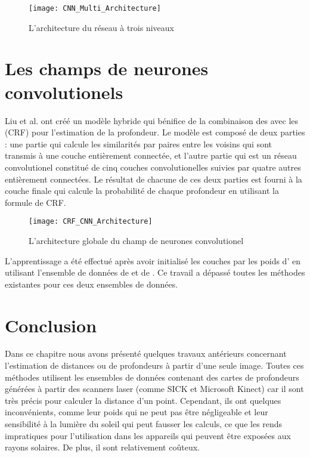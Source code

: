 \begin{figure}[H]
\begin{center}
\texttt{[image: CNN\_Multi\_Architecture]}
\caption{L'architecture du réseau à trois niveaux}{}
\end{center}
\end{figure}

\section{Les champs de neurones convolutionels}

Liu et al.\cite{liu2015deep} ont créé un modèle hybride qui bénifice de la combinaison
des  avec les  (CRF) pour l'estimation de la profondeur. Le modèle est composé de deux
parties : une partie qui calcule les similarités par paires entre les
 voisins qui sont transmis à une couche entièrement connectée,
et l'autre partie qui est un réseau convolutionel constitué de cinq couches
convolutionelles suivies par quatre autres entièrement connectées. Le résultat
de chacune de ces deux parties est fourni à la couche finale qui calcule la
probabilité de chaque profondeur en utilisant la formule de CRF.

\begin{figure}[H]
\texttt{[image: CRF\_CNN\_Architecture]}
\caption{L'architecture globale du champ de neurones convolutionel}{}
\end{figure}

L'apprentissage a été effectué après avoir initialisé les couches par les poids
d' en utilisant l'ensemble de données de  et de
. Ce travail a dépassé toutes les méthodes existantes pour
ces deux ensembles de données.

\section{Conclusion}

Dans ce chapitre nous avons présenté quelques travaux antérieurs concernant
l'estimation de distances ou de profondeurs à partir d'une seule image.
Toutes ces méthodes utilisent les ensembles de données contenant des cartes de
profondeurs générées à partir des scanners laser (comme SICK et Microsoft Kinect)
car il sont très précis pour calculer la distance d'un point.
Cependant, ils ont quelques inconvénients, comme leur poids qui ne peut pas être négligeable
et leur sensibilité à la lumière du soleil qui peut fausser les calculs, ce que
les rends impratiques pour l'utilisation dans les appareils qui peuvent être
exposées aux rayons solaires. De plus, il sont relativement coûteux.

